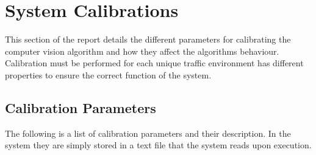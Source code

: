\chapter{System Calibrations}
\label{chapter:calibration}
This section of the report details the different parameters for calibrating the computer vision algorithm and how they affect the algorithms behaviour. Calibration must be performed for each unique traffic environment has different properties to ensure the correct function of the system. 

\section{Calibration Parameters}

The following is a list of calibration parameters and their description. In the system they are simply stored in a text file that the system reads upon execution.

